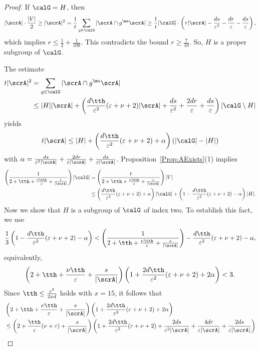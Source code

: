 \begin{proof}
If $\calG = H$, then 
$$|\scrA| \cdot \frac{|V|}{2} 
\geq |\scrA|^2 = \frac 1t \sum_{g\in \calG} |\scrA\cap g^\mo \scrA|
\geq \frac 1t |\calG| \cdot 
\left(r|\scrA|  - \frac{ds}{\varepsilon^2} 
- \frac{dr}{\varepsilon}
- \frac{ds}{\varepsilon}
\right),$$
which implies $r \leq \frac 12 + \frac 1{108}$. This contradicts the bound $r \geq \frac 7 {10}$. So, $H$ is a proper subgroup of $\calG$. 

The estimate 
\begin{align*}
t |\scrA|^2 
&= \sum_{g\in \calG} |\scrA\cap g^\mo \scrA| \\
&\leq |H| |\scrA| + \left(
\frac{d\tth}{\varepsilon^2}(\varepsilon + \nu+ 2)|\scrA|
+ \frac{ds}{\varepsilon^2} + \frac{2dr}\varepsilon + \frac{ds}{\varepsilon}
\right)
|\calG\setminus H|
\end{align*}
yields
$$t |\scrA|  
\leq |H| + 
\left(
\frac{d\tth}{\varepsilon^2}(\varepsilon + \nu+ 2)
+ 
\alpha
\right)
(|\calG| - |H|)$$
with $\alpha  = \frac{ds}{\varepsilon^2|\scrA|} + \frac{2dr}{\varepsilon |\scrA|} + \frac{ds}{\varepsilon |\scrA|}$. 
Proposition~\ref{Prop:AExists}(1) implies
\begin{align*}
\left(\frac{1}{2+ \tth + \frac{\nu\tth}{\varepsilon} +\frac{s}{|\scrA|}}\right) |\calG| 
& = \left(\frac{t}{2+ \tth + \frac{\nu\tth}{\varepsilon} + \frac{s}{|\scrA|}}\right) |V| \\
&\leq 
 \left(
\frac{d\tth}{\varepsilon^2}(\varepsilon + \nu+ 2)
+ 
\alpha
\right)|\calG| 
+  \left(1 - \frac{d\tth}{\varepsilon^2}(\varepsilon + \nu+ 2)
- \alpha
\right) |H|.
\end{align*}
Now we show that $H$ is a subgroup of $\calG$ of index two. To establish this fact, we use 
\[\frac 13 \left(1 - \frac{d\tth}{\varepsilon^2}(\varepsilon + \nu+ 2) - \alpha \right)
< 
\left(\frac{1}{2+ \tth + \frac{\nu\tth}{\varepsilon}+ \frac{s}{|\scrA|}}\right) - \frac{d\tth}{\varepsilon^2}(\varepsilon + \nu+ 2) - \alpha,\]
equivalently, 
$$\left(2 + \tth + \frac{\nu\tth}{\varepsilon} +\frac{s}{|\scrA|}\right) \left( 1 + \frac{2d\tth}{\varepsilon^2}(\varepsilon + \nu+ 2) + 2\alpha \right) < 3.$$
Since $\tth\leq  \frac{\varepsilon^{2}}{2x d}$ holds with $x= 15$, it follows that  
\begin{align*}
& \left(2 + \tth + \frac{\nu\tth}{\varepsilon} + \frac{s}{|\scrA|}\right) \left( 1 + \frac{2d\tth}{\varepsilon^2}(\varepsilon + \nu+ 2) +
2\alpha \right)\\
& 
\leq 
\left(2 + \frac{\tth}{\varepsilon} (\nu + \varepsilon) + \frac{s}{|\scrA|}\right) \left( 1 + \frac{2d\tth}{\varepsilon^2}(\varepsilon + \nu+ 2) + \frac{2ds}{\varepsilon^2|\scrA|} + \frac{4dr}{\varepsilon |\scrA| } + \frac{2ds}{\varepsilon |\scrA|} \right)\\

\end{align*}
\end{proof}
